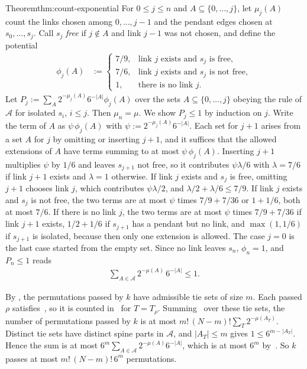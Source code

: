 \begin{Proof}{Theorem}{thm:count-exponential}
For $0\leq j\leq n$ and $A\subseteq\{0,\ldots,j\}$, let $\mu_j(A)$ count the
links chosen among $0,\ldots,j-1$ and the pendant edges chosen at
$s_0,\ldots,s_j$. Call $s_j$ \emph{free} if $j\notin A$ and link $j-1$ was not
chosen, and define the potential
\begin{align}
 \phi_j(A)&:=\begin{cases}7/9,&\text{link }j\text{ exists and }s_j\text{ is free},\\7/6,&\text{link }j\text{ exists and }s_j\text{ is not free},\\1,&\text{there is no link }j.\end{cases}\label{eq:potential}
\end{align}
Let $P_j:=\sum_A2^{-\mu_j(A)}6^{-|A|}\phi_j(A)$ over the sets
$A\subseteq\{0,\ldots,j\}$ obeying the rule of $\mathcal A$ for isolated
$s_i$, $i\leq j$. Then $\mu_n=\mu$. We show $P_j\leq1$ by induction on
$j$. Write the term of $A$ as $\psi\,\phi_j(A)$ with
$\psi:=2^{-\mu_j(A)}6^{-|A|}$. Each set for $j+1$ arises from a set $A$ for
$j$ by omitting or inserting $j+1$, and it suffices that the allowed
extensions of $A$ have terms summing to at most $\psi\,\phi_j(A)$. Inserting
$j+1$ multiplies $\psi$ by $1/6$ and leaves $s_{j+1}$ not free, so it
contributes $\psi\lambda/6$ with $\lambda=7/6$ if link $j+1$ exists and $\lambda=1$
otherwise. If link $j$ exists and $s_j$ is free, omitting $j+1$ chooses link
$j$, which contributes $\psi\lambda/2$, and $\lambda/2+\lambda/6\leq7/9$. If
link $j$ exists and $s_j$ is not free, the two terms are at most
$\psi$ times $7/9+7/36$ or $1+1/6$, both at most $7/6$. If there is no
link $j$, the two terms are at most $\psi$ times $7/9+7/36$ if link $j+1$ exists, $1/2+1/6$ if $s_{j+1}$
has a pendant but no link, and $\max(1,1/6)$ if $s_{j+1}$ is isolated,
because then only one extension is allowed. The case $j=0$ is the last
case started from the empty set. Since no link leaves $s_n$, $\phi_n=1$,
and $P_n\leq1$ reads
\begin{align}\label{eq:path-weight}
 \sum_{A\in\mathcal A}2^{-\mu(A)}\,6^{-|A|}\leq1.
\end{align}

By , the permutations passed by $k$ have
admissible tie sets of size $m$. Each passed $\rho$ satisfies~,
so it is counted in~ for $T=T_\rho$. Summing~
over these tie sets, the number of permutations passed by $k$ is at most
$m!\,(N-m)!\sum_T2^{-\mu(A_T)}$. Distinct tie sets have distinct spine parts
in $\mathcal A$, and $|A_T|\leq m$ gives $1\leq6^{m-|A_T|}$. Hence the sum
is at most $6^m\sum_{A\in\mathcal A}2^{-\mu(A)}6^{-|A|}$, which is at most
$6^m$ by~. So $k$ passes at most
$m!\,(N-m)!\,6^m$ permutations.


\end{Proof}
